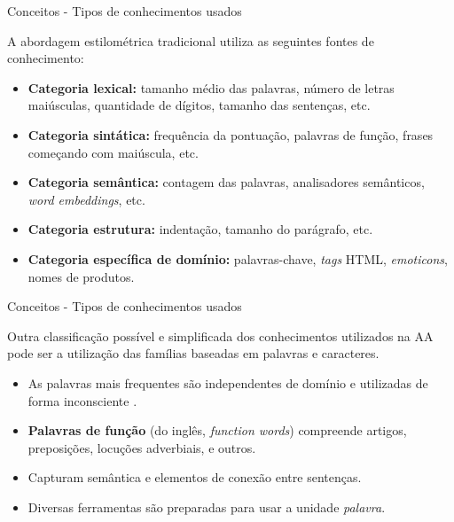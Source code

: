 \begin{frame}{Conceitos - Tipos de conhecimentos usados}

A abordagem estilométrica tradicional utiliza as seguintes fontes de conhecimento:

\begin{itemize}
	\item {\bf Categoria lexical:} tamanho médio das palavras, número de letras maiúsculas, quantidade de dígitos, tamanho das sentenças, etc.
	
	\item {\bf Categoria sintática:} frequência da pontuação, palavras de função, frases começando com maiúscula, etc.
	
	\item {\bf Categoria semântica:} contagem das palavras, analisadores semânticos, {\it word embeddings}, etc.
	
	\item {\bf Categoria estrutura:} indentação, tamanho do parágrafo, etc.
	
	\item {\bf Categoria específica de domínio:} palavras-chave, {\it tags} HTML, {\it emoticons}, nomes de produtos.
\end{itemize}
\end{frame}


\begin{frame}{Conceitos - Tipos de conhecimentos usados}

Outra classificação possível e simplificada dos conhecimentos utilizados na AA pode ser a utilização das famílias baseadas em palavras e caracteres.


\begin{tcolorbox}[colback=blue!1!white,colframe=blue!35!black,title=Palavras,valign=center]
	\begin{itemize}
		\item As palavras mais frequentes são independentes de domínio e utilizadas de forma inconsciente \cite{Kestemont2014}.
		\item {\bf Palavras de função} (do inglês, {\it function words}) compreende artigos, preposições, locuções adverbiais, e outros.\\
		\item Capturam semântica e elementos de conexão entre sentenças.
		\item Diversas ferramentas são preparadas para usar a unidade {\it palavra}.
	\end{itemize}			
\end{tcolorbox}

\end{frame}

